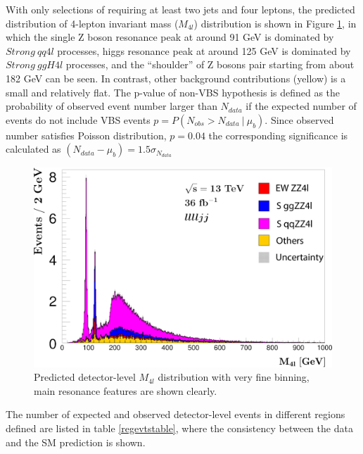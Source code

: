 \documentclass[12pt]{article}
\begin{document}
        \par With only selections of requiring at least two jets and four leptons, the predicted distribution 
        of 4-lepton invariant mass ($M_{4l}$) distribution is shown in Figure \ref{fig:finebined}, in which 
        the single Z boson resonance peak at around 91 GeV is dominated by $Strong\ qq4l$ processes, higgs resonance peak at around 125 GeV is dominated by 
        $Strong\ ggH4l$ processes, and the ``shoulder'' of Z bosons pair starting from about 182 GeV can be seen. In contrast, other background contributions 
        (yellow) is a small and relatively flat. The p-value of non-VBS hypothesis is defined as the probability of observed event number larger than $N_{data}$
        if the expected number of events do not include VBS events $p = P(N_{obs} > N_{data}\ |\ \mu_b)$. Since observed number satisfies Poisson distribution, 
        $p = 0.04$ the corresponding significance is calculated as $(N_{data} - \mu_b) = 1.5\sigma_{N_{data}}$
        \begin{figure}[ht]
            \begin{centering}
            \includegraphics[scale=0.12]{ps/det_llll_m_stack.png}
            \caption{Predicted detector-level $M_{4l}$ distribution with very fine binning, main resonance features are shown clearly.}
            \label{fig:finebined}
            \end{centering}
            
        \end{figure}
        \par The number of expected and observed detector-level events in different regions defined are listed in 
        table \ref{regevtstable}, where the consistency between the data and the SM prediction is shown. 
\end{document}
